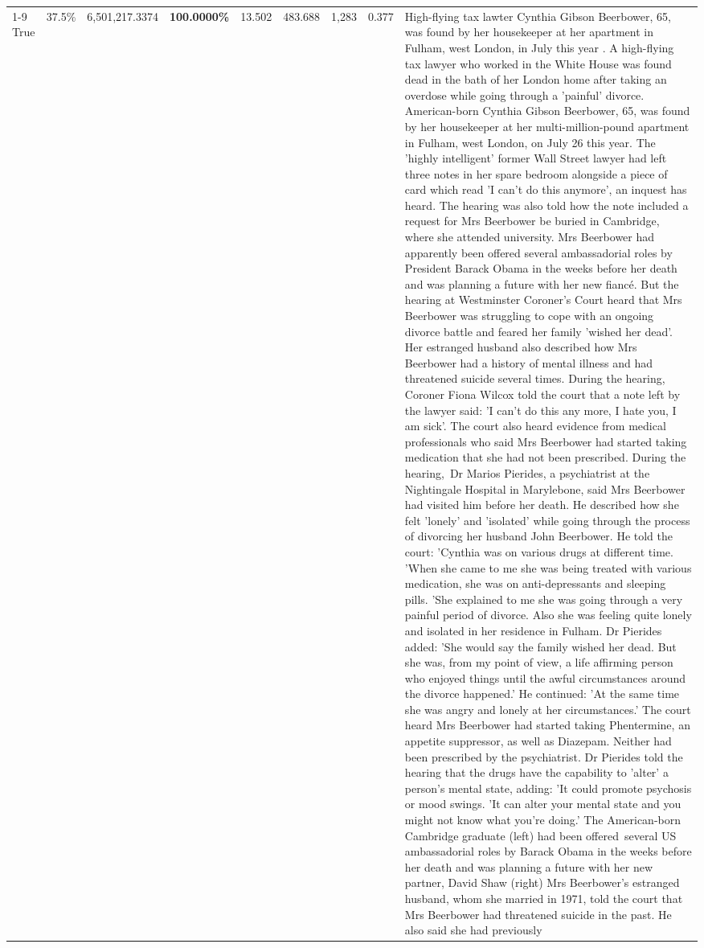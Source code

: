 \begin{table}[H]
\begin{tabular}{lllrlllll}
\cline{1-9}
True & 37.5\% & 6,501,217.3374 & \bfseries \color{red} 100.0000\% & 13.502 & 483.688 & 1,283 & 0.377 & High-flying tax lawter Cynthia Gibson Beerbower, 65, was found by her housekeeper at her apartment in Fulham, west London, in July this year . A high-flying tax lawyer who worked in the White House was found dead in the bath of her London home after taking an overdose while going through a 'painful' divorce. American-born Cynthia Gibson Beerbower, 65, was found by her housekeeper at her multi-million-pound apartment in Fulham, west London, on July 26 this year. The 'highly intelligent' former Wall Street lawyer had left three notes in her spare bedroom alongside a piece of card which read 'I can't do this anymore', an inquest has heard. The hearing was also told how the note included a request for Mrs Beerbower be buried in Cambridge, where she attended university. Mrs Beerbower had apparently been offered several ambassadorial roles by President Barack Obama in the weeks before her death and was planning a future with her new fiancé. But the hearing at Westminster Coroner's Court heard that Mrs Beerbower was struggling to cope with an ongoing divorce battle and feared her family 'wished her dead'. Her estranged husband also described how Mrs Beerbower had a history of mental illness and had threatened suicide several times. During the hearing, Coroner Fiona Wilcox told the court that a note left by the lawyer said: 'I can't do this any more, I hate you, I am sick'. The court also heard evidence from medical professionals who said Mrs Beerbower had started taking medication that she had not been prescribed. During the hearing, Dr Marios Pierides, a psychiatrist at the Nightingale Hospital in Marylebone, said Mrs Beerbower had visited him before her death. He described how she felt 'lonely' and 'isolated' while going through the process of divorcing her husband John Beerbower. He told the court: 'Cynthia was on various drugs at different time. 'When she came to me she was being treated with various medication, she was on anti-depressants and sleeping pills. 'She explained to me she was going through a very painful period of divorce. Also she was feeling quite lonely and isolated in her residence in Fulham. Dr Pierides added: 'She would say the family wished her dead. But she was, from my point of view, a life affirming person who enjoyed things until the awful circumstances around the divorce happened.' He continued: 'At the same time she was angry and lonely at her circumstances.' The court heard Mrs Beerbower had started taking Phentermine, an appetite suppressor, as well as Diazepam. Neither had been prescribed by the psychiatrist. Dr Pierides told the hearing that the drugs have the capability to 'alter' a person's mental state, adding: 'It could promote psychosis or mood swings. 'It can alter your mental state and you might not know what you're doing.' The American-born Cambridge graduate (left) had been offered several US ambassadorial roles by Barack Obama in the weeks before her death and was planning a future with her new partner, David Shaw (right) Mrs Beerbower's estranged husband, whom she married in 1971, told the court that Mrs Beerbower had threatened suicide in the past. He also said she had previously 
\end{tabular}
\end{table}
